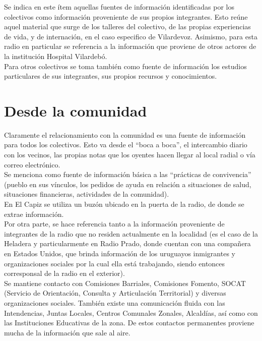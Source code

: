 Se indica en este ítem aquellas fuentes de información identificadas por los colectivos como información proveniente de sus propios integrantes. Esto reúne aquel material que surge de los talleres del colectivo, de las propias experiencias de vida, y de internación, en el caso especifico de Vilardevoz. Asimismo, para esta radio en particular se referencia a la información que proviene de otros actores de la  institución Hospital Vilardebó.\\

Para otros colectivos se toma también como fuente de información los estudios particulares de sus integrantes, sus propios recursos y conocimientos.\\

\section{Desde la comunidad}

Claramente el relacionamiento con la comunidad es una fuente de información para todos los colectivos. Esto va desde el “boca a boca”, el intercambio diario con los vecinos, las propias notas que los oyentes hacen llegar al local radial o vía correo electrónico.\\

Se menciona como fuente de información básica a las “prácticas de convivencia” (pueblo en sus vínculos, los pedidos de ayuda en relación a situaciones de salud, situaciones financieras, actividades de la comunidad).\\

En El Capiz se utiliza un buzón ubicado en la puerta de la radio, de donde se extrae información.\\

Por otra parte, se hace referencia tanto a la información proveniente de integrantes de la radio que no residen actualmente en la localidad (es el caso de la Heladera y particularmente en Radio Prado, donde cuentan con una compañera en Estados Unidos, que brinda información de los uruguayos inmigrantes y organizaciones sociales por la cual ella está trabajando, siendo entonces corresponsal de la radio en el exterior).\\

Se mantiene contacto con Comisiones Barriales, Comisiones Fomento, SOCAT (Servicio de Orientación, Consulta y Articulación Territorial) y diversas organizaciones sociales. También existe una comunicación fluida con las Intendencias, Juntas Locales, Centros Comunales Zonales, Alcaldías, así como con las Instituciones Educativas de la zona. De estos contactos permanentes proviene mucha de la información que sale al aire.\\

